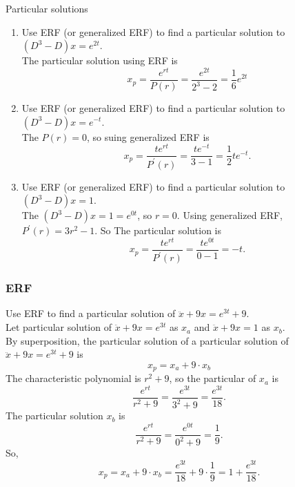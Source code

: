 \begin{problem}
  Particular solutions
\end{problem}

\begin{enumerate}
\item Use ERF (or generalized ERF) to find a particular solution to $(D^3 - D)x = e^{2t}$. \\
  The particular solution using ERF is
  \begin{equation*}
    x_p = \frac{e^{rt}}{P(r)} = \frac{e^{2t}}{2^3 - 2} = \frac{1}{6} e^{2t} 
  \end{equation*}
\item Use ERF (or generalized ERF) to find a particular solution to $(D^3 - D)x = e^{-t}$. \\
  The $P(r) = 0$, so suing generalized ERF is
  \begin{equation*}
    x_p = \frac{te^{rt}}{P^{\prime}(r)} = \frac{te^{-t}}{3 - 1} = \frac{1}{2} te^{-t}. 
  \end{equation*}
\item Use ERF (or generalized ERF) to find a particular solution to $(D^3 - D)x = 1$. \\
  The $(D^3 - D)x = 1 = e^{0t}$, so $r=0$.
  Using generalized ERF, $P^{ \prime} (r) = 3 r^2 - 1$. So
  The particular solution is
  \begin{equation*}
    x_p = \frac{te^{rt}}{P^{\prime} (r)} = \frac{te^{0t}}{0 - 1} = - t. 
  \end{equation*}
\end{enumerate}
\clearpage
\subsubsection{ERF}

Use ERF to find a particular solution of $\ddot{x} + 9x = e^{3t} + 9$.\\

Let particular solution of $\ddot{x} + 9x = e^{3t}$ as $x_a$ and
$\ddot{x} + 9x = 1$ as $x_b$. \\
By superposition,  the particular solution of  a particular solution of
$\ddot{x} + 9x = e^{3t} + 9$ is
\begin{equation*}
  x_p = x_a + 9 \cdot x_b
\end{equation*}
The characteristic polynomial is $r^2 + 9$, so the particular of
$x_a$ is
\begin{equation*}
  \frac{e^{rt}}{r^2 + 9} = \frac{e^{3t}}{3^2 + 9} = \frac{e^{3t}}{18}.  
\end{equation*}
The particular solution $x_b$ is
\begin{equation*}
  \frac{e^{rt}}{r^2 + 9} = \frac{e^{0t}}{0^2 + 9} = \frac{1}{9}. 
\end{equation*}
So,
\begin{equation*}
  x_p = x_a + 9 \cdot x_b = \frac{e^{3t}}{18} + 9 \cdot \frac{1}{9} =  1 + \frac{e^{3t}}{18}. 
\end{equation*}

